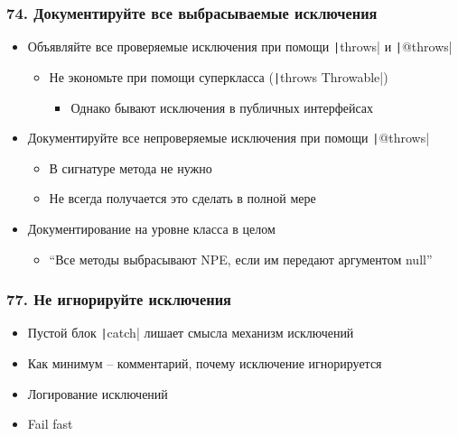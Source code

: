 \documentclass[xetex,mathserif,serif]{beamer}
\begin{document}
	\begin{frame}
		\frametitle{74. Документируйте все выбрасываемые исключения}
		\begin{itemize}
			\item Объявляйте все проверяемые исключения при помощи \texttt|throws| и \texttt|@throws|
			\begin{itemize}
				\item Не экономьте при помощи суперкласса (\texttt|throws Throwable|)
				\begin{itemize}
					\item Однако бывают исключения в публичных интерфейсах
				\end{itemize}
			\end{itemize}
			\item Документируйте все непроверяемые исключения при помощи \texttt|@throws|
			\begin{itemize}
				\item В сигнатуре метода не нужно
				\item Не всегда получается это сделать в полной мере
			\end{itemize}
			\item Документирование на уровне класса в целом
			\begin{itemize}
				\item ``Все методы выбрасывают NPE, если им передают аргументом null''
			\end{itemize}
		\end{itemize}
	\end{frame}

	\begin{frame}
		\frametitle{77. Не игнорируйте исключения}
		\begin{itemize}
			\item Пустой блок \texttt|catch| лишает смысла механизм исключений
			\item Как минимум -- комментарий, почему исключение игнорируется
			\item Логирование исключений
			\item Fail fast
		\end{itemize}
	\end{frame}
\end{document}
